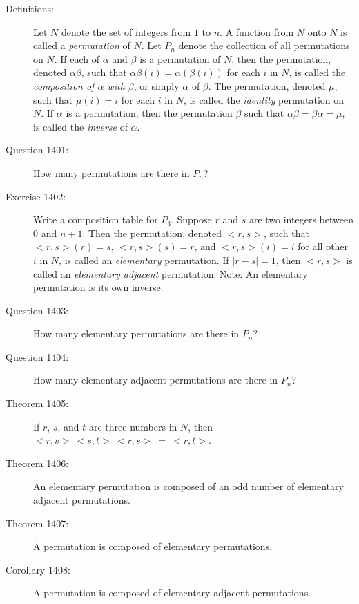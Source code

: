 \documentclass{article}
\begin{document}
\begin{description}

  \item[Definitions:] Let $N$ denote the set of integers from $1$ to $n$. A function from $N$ onto $N$ is called a \emph{permutation} of $N$. Let $P_{n}$ denote the collection of all permutations on $N$. If each of $\alpha$ and $\beta$ is a permutation of $N$, then the permutation, denoted $\alpha\beta$, such that $\alpha\beta(i)=\alpha(\beta(i))$ for each $i$ in $N$, is called the \emph{composition of $\alpha$ with $\beta$}, or simply $\alpha$ of $\beta$. The permutation, denoted $\mu$, such that $\mu(i)=i$ for each $i$ in $N$, is called the \emph{identity} permutation on $N$. If $\alpha$ is a permutation, then the permutation $\beta$ such that $\alpha \beta = \beta \alpha = \mu$, is called the \emph{inverse} of $\alpha$.

  \item[Question 1401:] How many permutations are there in $P_{n}$?

  \item[Exercise 1402:] Write a composition table for $P_{3}$. Suppose $r$ and $s$ are two integers between $0$ and $n+1$. Then the permutation, denoted $<r,s>$, such that $<r,s>(r)=s$, $<r,s>(s)=r$, and $<r,s>(i)=i$ for all other $i$ in $N$, is called an \emph{elementary} permutation. If $\vert r-s \vert = 1$, then $<r,s>$ is called an \emph{elementary adjacent} permutation. Note: An elementary permutation is its own inverse.

  \item[Question 1403:] How many elementary permutations are there in $P_{n}$?

  \item[Question 1404:] How many elementary adjacent permutations are there in $P_{n}$?

  \item[Theorem 1405:] If $r$, $s$, and $t$ are three numbers in $N$, then $<r,s>\ <s,t>\ <r,s>\ =\ <r,t>$.

  \item[Theorem 1406:] An elementary permutation is composed of an odd number of elementary adjacent permutations.

  \item[Theorem 1407:] A permutation is composed of elementary permutations.

  \item[Corollary 1408:] A permutation is composed of elementary adjacent permutations.


\end{description}
\end{document}
